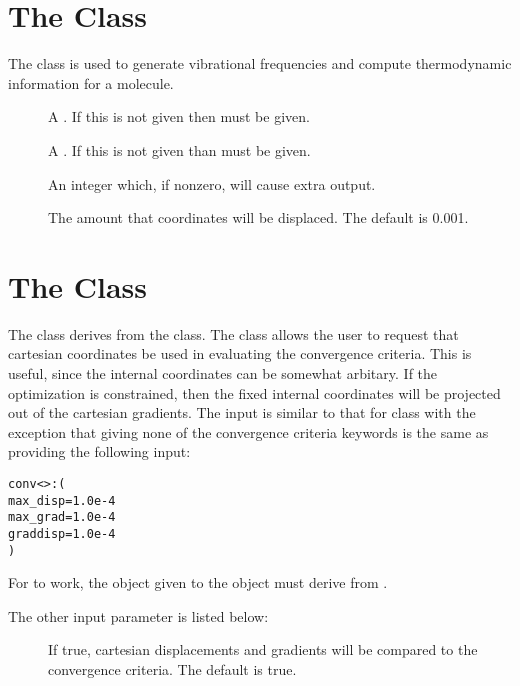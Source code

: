 \section{The  Class}\label{MolecularFrequencies}

The  class is used to generate vibrational
frequencies and compute thermodynamic information for a molecule.

\begin{description}
  \item[] A 
    .  If this is not given then
     must be given.

  \item[] A 
    .  If this is not given than 
    must be given.

  \item[] An integer which, if nonzero, will cause extra
    output.

  \item[] The amount that coordinates will be
    displaced.  The default is 0.001.

\end{description}


\section{The  Class}\label{MolEnergyConvergence}

The  class derives from the
 class.  The  class
allows the user to request that cartesian coordinates be used in evaluating
the convergence criteria.  This is useful, since the internal coordinates
can be somewhat arbitary.  If the optimization is constrained, then the
fixed internal coordinates will be projected out of the cartesian
gradients.  The input is similar to that for  class
with the exception that giving none of the convergence criteria keywords is
the same as providing the following input:
\begin{alltt}
  conv<>: (
    max_disp = 1.0e-4
    max_grad = 1.0e-4
    graddisp = 1.0e-4
  )
\end{alltt}

For  to work, the  object
given to the  object must derive from
.

The other input parameter is listed below:
\begin{description}
  \item[] If true, cartesian displacements and gradients
    will be compared to the convergence criteria.  The default is true.

\end{description}
